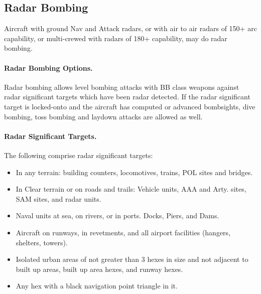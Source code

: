 \begin{advancedrules}
{\begin{itemize}
\end{itemize}

\subsection{Radar Bombing}

Aircraft with ground Nav and Attack radars, or with air to air radars of 150+ arc capability, or multi-crewed with radars of 180+ capability, may do radar bombing.

\paragraph{Radar Bombing Options.} Radar bombing allows level bombing attacks with BB class weapons against radar significant targets which have been radar detected. If the radar significant target is locked-onto and the aircraft has computed or advanced bombsights, dive bombing, toss bombing and laydown attacks are allowed as well.

\paragraph{Radar Significant Targets.} The following comprise radar significant targets:

\begin{itemize}

    \item In any terrain: building counters, locomotives, trains, POL sites and bridges.

    \item In Clear terrain or on roads and trails: Vehicle units, AAA and Arty. sites, SAM sites, and radar units.

    \item Naval units at sea, on rivers, or in ports. Docks, Piers, and Dams.

    \item Aircraft on runways, in revetments, and all airport facilities (hangers, shelters, towers).

    \item Isolated urban areas of not greater than 3 hexes in size and not adjacent to built up areas, built up area hexes, and runway hexes.
    
    \item Any hex with a black navigation point triangle in it.

\end{itemize}

}
\end{advancedrules}
